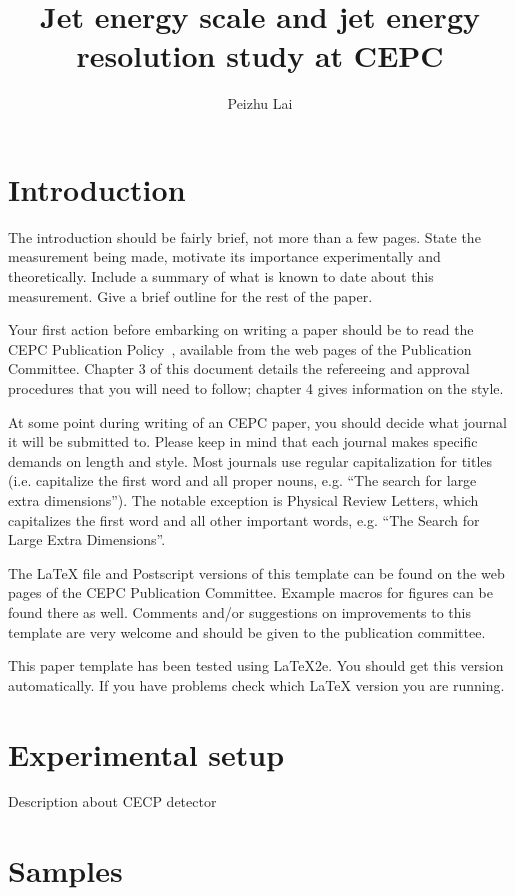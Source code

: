 \documentclass[11pt,a4paper]{cepcnote}
\title{ Jet energy scale and jet energy resolution study at CEPC }
\author{Peizhu Lai}
\begin{document}
\tableofcontents
\clearpage

\section{Introduction}

The introduction should be fairly brief, not more than a few pages.
State the measurement being made, motivate its importance
experimentally and theoretically. Include a summary of what is known
to date about this measurement. Give a brief outline for the rest of
the paper.

Your first action before embarking on writing a paper should be to
read the CEPC Publication Policy~\cite{publication_policy}, available
from the web pages of the Publication Committee. Chapter 3 of this
document details the refereeing and approval procedures that you will
need to follow; chapter 4 gives information on the style.

At some point during writing of an CEPC paper, you should decide what
journal it will be submitted to.  Please keep in mind that each
journal makes specific demands on length and style.  Most journals use
regular capitalization for titles (i.e. capitalize the first word and
all proper nouns, e.g. ``The search for large extra dimensions''). The
notable exception is Physical Review Letters, which capitalizes the
first word and all other important words, e.g. ``The Search for Large
Extra Dimensions''.

The \LaTeX{} file and Postscript versions of this template can be
found on the web pages of the CEPC Publication Committee. Example
macros for figures can be found there as well.  Comments and/or
suggestions on improvements to this template are very welcome and
should be given to the publication committee.

This paper template has been tested using \LaTeX{}2e.  You should get
this version automatically. If you have problems check which \LaTeX{}
version you are running.


\section{Experimental setup}

Description about CECP detector

\section{Samples}
\end{document}
